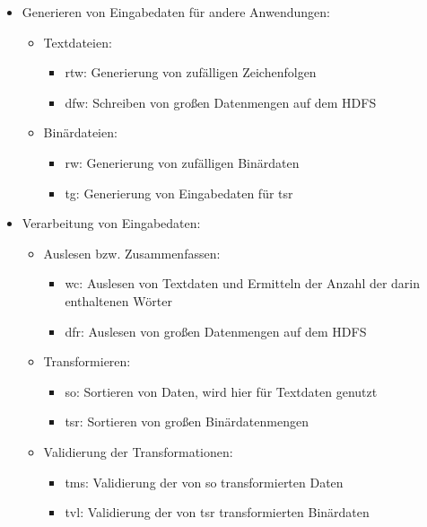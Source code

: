 \begin{itemize}
    \item Generieren von Eingabedaten für andere Anwendungen:
    \begin{itemize}
        \item Textdateien:
        \begin{itemize}
            \item \gls{rtw}: Generierung von zufälligen Zeichenfolgen
            \item \gls{dfw}: Schreiben von großen Datenmengen auf dem HDFS
        \end{itemize}
        \item Binärdateien:
        \begin{itemize}
            \item \gls{rw}: Generierung von zufälligen Binärdaten
            \item \gls{tg}: Generierung von Eingabedaten für \acrlong{tsr}
       \end{itemize}
    \end{itemize}

    \item Verarbeitung von Eingabedaten:
    \begin{itemize}
        \item Auslesen bzw. Zusammenfassen:
        \begin{itemize}
            \item \gls{wc}: Auslesen von Textdaten und Ermitteln der Anzahl der darin enthaltenen Wörter
            \item \gls{dfr}: Auslesen von großen Datenmengen auf dem HDFS
        \end{itemize}
        \item Transformieren:
        \begin{itemize}
            \item \gls{so}: Sortieren von Daten, wird hier für Textdaten genutzt
            \item \gls{tsr}: Sortieren von großen Binärdatenmengen
        \end{itemize}
        \item Validierung der Transformationen:
        \begin{itemize}
            \item \gls{tms}: Validierung der von \acrlong{so} transformierten Daten
            \item \gls{tvl}: Validierung der von \acrlong{tsr} transformierten Binärdaten
        \end{itemize}
    \end{itemize}


\end{itemize}
